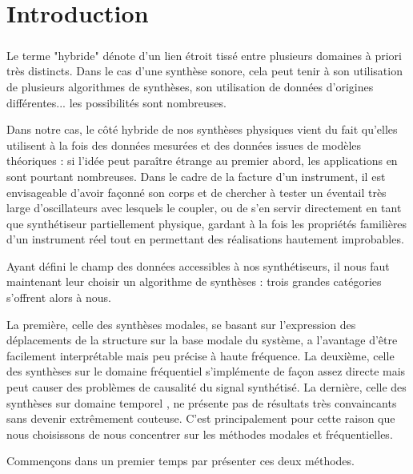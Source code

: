 \chapter*{Introduction}

\paragraph*{}
Le terme "hybride" dénote d'un lien étroit tissé entre plusieurs domaines à priori très distincts. Dans le cas d'une synthèse sonore, cela peut tenir à son utilisation de plusieurs algorithmes de synthèses, son utilisation de données d'origines différentes... les possibilités sont nombreuses.

Dans notre cas, le côté hybride de nos synthèses physiques vient du fait qu'elles utilisent à la fois des données mesurées et des données issues de modèles théoriques : si l'idée peut paraître étrange au premier abord, les applications en sont pourtant nombreuses. Dans le cadre de la facture d'un instrument, il est envisageable d'avoir façonné son corps et de chercher à tester un éventail très large d'oscillateurs avec lesquels le coupler, ou de s'en servir directement en tant que synthétiseur partiellement physique, gardant à la fois les propriétés familières d'un instrument réel tout en permettant des réalisations hautement improbables.

Ayant défini le champ des données accessibles à nos synthétiseurs, il nous faut maintenant leur choisir un algorithme de synthèses : trois grandes catégories s'offrent alors à nous.

La première, celle des synthèses modales, se basant sur l'expression des déplacements de la structure sur la base modale du système, a l'avantage d'être facilement interprétable mais peu précise à haute fréquence.
La deuxième, celle des synthèses sur le domaine fréquentiel s'implémente de façon assez directe mais peut causer des problèmes de causalité du signal synthétisé. La dernière, celle des synthèses sur domaine temporel \cite{karplus1983digital,smith1987music,bensa2003simulation}, ne présente pas de résultats très convaincants sans devenir extrêmement couteuse.
C'est principalement pour cette raison que nous choisissons de nous concentrer sur les méthodes modales et fréquentielles.

Commençons dans un premier temps par présenter ces deux méthodes.